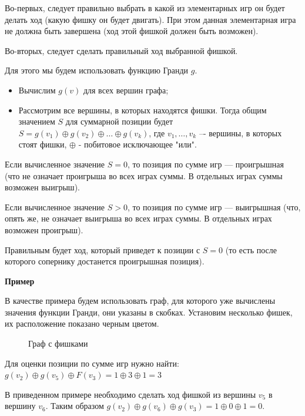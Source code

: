 \documentclass[12pt, letterpaper, titlepage]{article}
\begin{document}
Во-первых, следует правильно выбрать в какой из элементарных игр он будет делать ход (какую фишку он будет двигать). При этом данная элементарная игра не должна быть завершена (ход этой фишкой должен быть возможен).

Во-вторых, следует сделать правильный ход выбранной фишкой.

Для этого мы будем использовать функцию Гранди $g$.
\begin{itemize}
    \item Вычислим $g(v)$ для всех вершин графа;
    \item Рассмотрим все вершины, в которых находятся фишки. Тогда общим значением $S$ для суммарной позиции будет  $S = g(v_1) \oplus g(v_2) \oplus \dots \oplus g(v_k)$, где $v_1, \dots, v_k$ –- вершины, в которых стоят фишки, $\oplus$ - побитовое исключающее "или".
\end{itemize}


Если вычисленное значение $S = 0$, то позиция по сумме игр — проигрышная (что не означает проигрыша во всех играх суммы. В отдельных играх суммы возможен выигрыш).

Если вычисленное значение $S > 0$, то позиция по сумме игр — выигрышная (что, опять же, не означает выигрыша во всех играх суммы. В отдельных играх возможен проигрыш).

Правильным будет ход, который приведет к позиции с $S = 0$ (то есть после которого сопернику достанется проигрышная позиция).

\textbf{Пример}

В качестве примера будем использовать граф, для которого уже вычислены значения функции Гранди, они указаны в скобках. Установим несколько фишек, их расположение показано черным цветом.

\begin{figure}[H]\centering\caption{Граф с фишками}\end{figure}

Для оценки позиции по сумме игр нужно найти:
$g(v_2) \oplus g(v_5) \oplus F(v_3) = 1 \oplus 3 \oplus 1 = 3$

В приведенном примере необходимо сделать ход фишкой из вершины $v_5$ в вершину $v_6$. Таким образом $g(v_2) \oplus g(v_6) \oplus g(v_3) = 1 \oplus 0 \oplus 1 = 0$.
\end{document}

